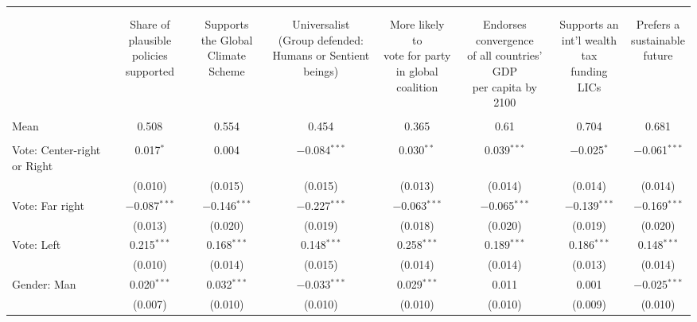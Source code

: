 
\begin{tabular}{@{\extracolsep{5pt}}lccccccc} 
\\[-1.8ex]\hline 
\hline \\[-1.8ex] 
\\[-1.8ex] & \makecell{Share of\\plausible policies\\supported} & \makecell{Supports\\the Global\\Climate Scheme} & \makecell{Universalist\\(Group defended:\\Humans or Sentient beings)} & \makecell{More likely to\\vote for party\\in global coalition} & \makecell{Endorses convergence\\of all countries' GDP\\per capita by 2100} & \makecell{Supports an\\int'l wealth tax\\funding LICs} & \makecell{Prefers a\\sustainable\\future} \\ 
\hline \\[-1.8ex] 
Mean & 0.508 & 0.554 & 0.454 & 0.365 & 0.61 & 0.704 & 0.681  \\ \hline \\[-1.8ex]
 Vote: Center\mbox{-}right or Right & 0.017$^{*}$ & 0.004 & $-$0.084$^{***}$ & 0.030$^{**}$ & 0.039$^{***}$ & $-$0.025$^{*}$ & $-$0.061$^{***}$ \\ 
  & (0.010) & (0.015) & (0.015) & (0.013) & (0.014) & (0.014) & (0.014) \\ 
  Vote: Far right & $-$0.087$^{***}$ & $-$0.146$^{***}$ & $-$0.227$^{***}$ & $-$0.063$^{***}$ & $-$0.065$^{***}$ & $-$0.139$^{***}$ & $-$0.169$^{***}$ \\ 
  & (0.013) & (0.020) & (0.019) & (0.018) & (0.020) & (0.019) & (0.020) \\ 
  Vote: Left & 0.215$^{***}$ & 0.168$^{***}$ & 0.148$^{***}$ & 0.258$^{***}$ & 0.189$^{***}$ & 0.186$^{***}$ & 0.148$^{***}$ \\ 
  & (0.010) & (0.014) & (0.015) & (0.014) & (0.014) & (0.013) & (0.014) \\ 
  Gender: Man & 0.020$^{***}$ & 0.032$^{***}$ & $-$0.033$^{***}$ & 0.029$^{***}$ & 0.011 & 0.001 & $-$0.025$^{***}$ \\ 
  & (0.007) & (0.010) & (0.010) & (0.010) & (0.010) & (0.009) & (0.010) \\ 

\end{tabular}
